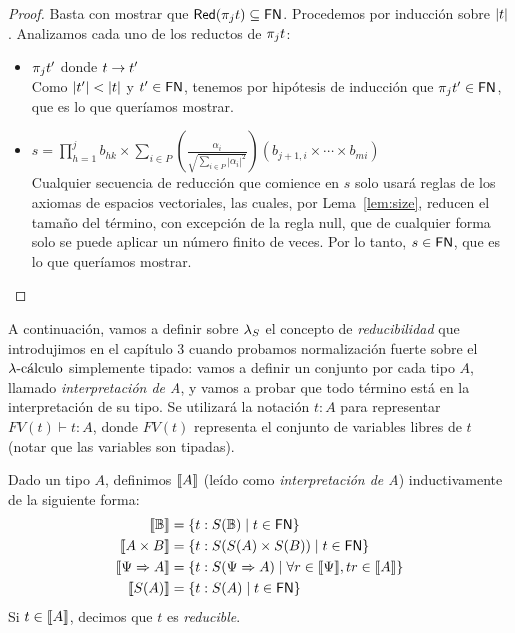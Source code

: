 \begin{proof}
  Basta con mostrar que \( \red{\proj{j}{t}} \subseteq \snset \). Procedemos por inducción sobre \( \lpl{t} \). Analizamos cada uno de los reductos de \( \proj{j}{t} \):
  \begin{itemize}
    \item \( \proj{j}{t'} \) donde \( t \reducesto t' \)
      \\ Como \( \lpl{t'} < \lpl{t} \) y \( t' \in \snset \), tenemos por hipótesis de inducción que \( \proj{j}{t'} \in \snset \), que es lo que queríamos mostrar.
    \item \( s = \prod\limits_{h = 1}^j b_{hk} \times \sum\limits_{i \in P} (\frac{\alpha_i}{\sqrt{\sum_{i \in P} |\alpha_i|^2}}) (b_{j + 1, i} \times \cdots \times b_{mi}) \)
      \\ Cualquier secuencia de reducción que comience en \( s \) solo usará reglas de los axiomas de espacios vectoriales, las cuales, por Lema~\ref{lem:size}, reducen el tamaño del término, con excepción de la regla \textsf{null}, que de cualquier forma solo se puede aplicar un número finito de veces. Por lo tanto, \( s \in \snset \), que es lo que queríamos mostrar.
      \qedhere
  \end{itemize}
\end{proof}

A continuación, vamos a definir sobre \( \lambdas \) el concepto de \textit{reducibilidad} que introdujimos en el capítulo 3 cuando probamos normalización fuerte sobre el \( \lambdacalculus \) simplemente tipado: vamos a definir un conjunto por cada tipo \( A \), llamado \textit{interpretación de A}, y vamos a probar que todo término está en la interpretación de su tipo. Se utilizará la notación \( t : A \) para representar \( FV(t) \vdash t : A \), donde \( FV(t) \) representa el conjunto de variables libres de \( t \) (notar que las variables son tipadas).

\begin{definition}
  Dado un tipo \( A \), definimos \( \interp{A} \) (leído como \textit{interpretación de A}) inductivamente de la siguiente forma:
  \begin{equation*}
    \begin{split}
      \interp{\qubittype} & = \{ t : S(\qubittype) \mid t \in \snset \} \\
      \interp{A \times B} & = \{ t : S(S(A) \times S(B)) \mid t \in \snset \} \\
      \interp{\Psi \Rightarrow A} & = \{ t : S(\Psi \Rightarrow A) \mid \forall r \in \interp{\Psi}, t r \in \interp{A} \} \\
      \interp{S(A)} & = \{ t : S(A) \mid t \in \snset \}
    \end{split}
  \end{equation*}
  Si \( t \in \interp{A} \), decimos que \( t \) es \textit{reducible}.
\end{definition}

